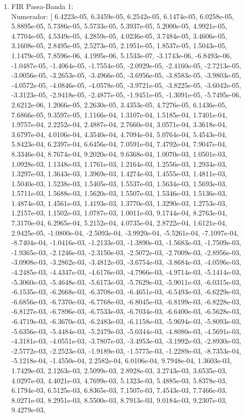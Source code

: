 \documentclass[12pt,fleqn]{article}
\begin{document}
\begin{enumerate}
    \item FIR Passa-Banda 1:
    \\ Numerador: [  6.4223e-05,  6.3459e-05,  6.2542e-05,  6.1474e-05,  6.0258e-05,  5.8895e-05,  5.7386e-05,  5.5733e-05,  5.3937e-05,  5.2000e-05,  4.9921e-05,  4.7704e-05,  4.5349e-05,  4.2859e-05,  4.0236e-05,  3.7484e-05,  3.4606e-05,  3.1608e-05,  2.8495e-05,  2.5273e-05,  2.1951e-05,  1.8537e-05,  1.5043e-05,  1.1479e-05,  7.8596e-06,  4.1995e-06,  5.1533e-07, -3.1743e-06, -6.8493e-06, -1.0487e-05, -1.4064e-05, -1.7554e-05,  -2.0929e-05, -2.4160e-05, -2.7213e-05, -3.0056e-05, -3.2653e-05, -3.4966e-05, -3.6956e-05, -3.8583e-05,  -3.9803e-05, -4.0572e-05, -4.0846e-05, -4.0578e-05, -3.9721e-05, -3.8225e-05, -3.6042e-05, -3.3123e-05,  -2.9418e-05, -2.4877e-05, -1.9451e-05, -1.3091e-05, -5.7495e-06,  2.6212e-06,  1.2066e-05,  2.2630e-05,  3.4353e-05,  4.7276e-05,  6.1436e-05,  7.6866e-05,  9.3597e-05,  1.1166e-04,  1.3107e-04,  1.5185e-04,  1.7401e-04,  1.9757e-04,  2.2252e-04,  2.4887e-04,  2.7660e-04,  3.0571e-04,  3.3618e-04,  3.6797e-04,  4.0106e-04,  4.3540e-04,  4.7094e-04,  5.0764e-04,  5.4543e-04,  5.8423e-04,  6.2397e-04,  6.6456e-04,  7.0591e-04,  7.4792e-04,  7.9047e-04,  8.3346e-04,  8.7674e-04,  9.2020e-04,  9.6368e-04,  1.0070e-03,  1.0501e-03,  1.0928e-03,  1.1348e-03,  1.1761e-03,  1.2164e-03,  1.2556e-03,  1.2934e-03,  1.3297e-03,  1.3643e-03,  1.3969e-03,  1.4274e-03,  1.4555e-03,  1.4811e-03,  1.5040e-03,  1.5238e-03,  1.5405e-03,  1.5537e-03,  1.5634e-03,  1.5693e-03,  1.5711e-03,  1.5688e-03,  1.5620e-03,  1.5507e-03,  1.5346e-03,  1.5136e-03,  1.4874e-03,  1.4561e-03,  1.4193e-03,  1.3770e-03,  1.3290e-03,  1.2753e-03,  1.2157e-03,  1.1502e-03,  1.0787e-03,  1.0011e-03,  9.1744e-04,  8.2763e-04,  7.3170e-04,  6.2965e-04,  5.2152e-04,  4.0735e-04,  2.8722e-04,  1.6121e-04,  2.9425e-05, -1.0800e-04, -2.5093e-04, -3.9920e-04, -5.5261e-04,  -7.1097e-04, -8.7404e-04, -1.0416e-03, -1.2133e-03, -1.3890e-03, -1.5683e-03, -1.7509e-03, -1.9365e-03,  -2.1246e-03, -2.3150e-03, -2.5072e-03, -2.7009e-03, -2.8956e-03, -3.0908e-03, -3.2862e-03, -3.4812e-03,  -3.6754e-03, -3.8684e-03, -4.0596e-03, -4.2485e-03, -4.4347e-03, -4.6176e-03, -4.7966e-03, -4.9714e-03,  -5.1414e-03, -5.3060e-03, -5.4648e-03, -5.6173e-03, -5.7629e-03, -5.9011e-03, -6.0315e-03, -6.1535e-03,  -6.2668e-03, -6.3708e-03, -6.4651e-03, -6.5493e-03, -6.6229e-03, -6.6856e-03, -6.7370e-03, -6.7768e-03,  -6.8045e-03, -6.8199e-03, -6.8228e-03, -6.8127e-03, -6.7896e-03, -6.7533e-03, -6.7034e-03, -6.6400e-03,  -6.5628e-03, -6.4719e-03, -6.3670e-03, -6.2483e-03, -6.1158e-03, -5.9694e-03, -5.8093e-03, -5.6356e-03,  -5.4484e-03, -5.2479e-03, -5.0344e-03, -4.8080e-03, -4.5691e-03, -4.3181e-03, -4.0551e-03, -3.7807e-03,  -3.4953e-03, -3.1992e-03, -2.8930e-03, -2.5772e-03, -2.2523e-03, -1.9189e-03, -1.5775e-03, -1.2289e-03,  -8.7353e-04, -5.1218e-04, -1.4550e-04,  2.2582e-04,  6.0106e-04,  9.7948e-04,  1.3603e-03,  1.7429e-03,  2.1263e-03,  2.5099e-03,  2.8928e-03,  3.2743e-03,  3.6535e-03,  4.0297e-03,  4.4021e-03,  4.7699e-03,  5.1323e-03,  5.4885e-03,  5.8378e-03,  6.1794e-03,  6.5125e-03,  6.8365e-03,  7.1507e-03,  7.4543e-03,  7.7466e-03,  8.0271e-03,  8.2951e-03,  8.5500e-03,  8.7913e-03,  9.0184e-03,  9.2307e-03,  9.4279e-03,  
\end{enumerate}
\end{document}

